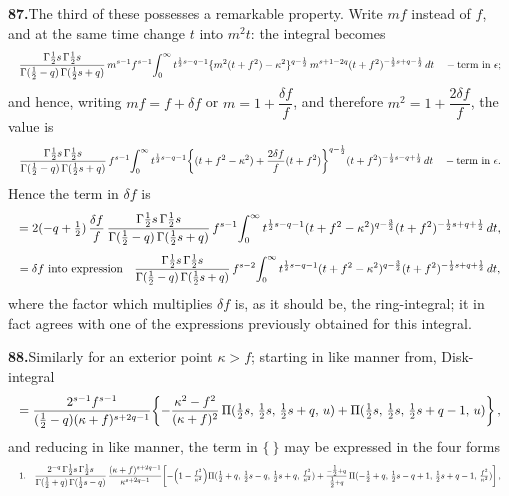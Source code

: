 \documentclass[11pt]{article}
\begin{document}
\noindent\textbf{87.}\quad The third of these possesses a remarkable property. Write $mf$ instead of $f$, and at the same time change $t$ into $m^{2}t$: the integral becomes
\[
\resizebox{\textwidth}{!}{$\displaystyle
\frac{\Gamma\tfrac{1}{2}s\,\Gamma\tfrac{1}{2}s}{\Gamma(\tfrac{1}{2}-q)\,\Gamma(\tfrac{1}{2}s+q)}\,m^{s-1}f^{s-1}\!\int_{0}^{\infty} t^{\frac{1}{2}s-q-1}\{m^{2}(t+f^{2})-\kappa^{2}\}^{q-\frac{1}{2}}\,m^{s+1-2q}(t+f^{2})^{-\frac{1}{2}s+q-\frac{1}{2}}\,dt \quad-\text{term in } \epsilon;$}
\]
and hence, writing $mf=f+\delta f$ or $m=1+\dfrac{\delta f}{f}$, and therefore $m^{2}=1+\dfrac{2\delta f}{f}$, the value is
\[
\resizebox{\textwidth}{!}{$\displaystyle
\frac{\Gamma\tfrac{1}{2}s\,\Gamma\tfrac{1}{2}s}{\Gamma(\tfrac{1}{2}-q)\,\Gamma(\tfrac{1}{2}s+q)}\,f^{s-1}\!\int_{0}^{\infty} t^{\frac{1}{2}s-q-1}\!\left\{(t+f^{2}-\kappa^{2}) + \frac{2\delta f}{f}(t+f^{2})\right\}^{q-\frac{1}{2}}\!(t+f^{2})^{-\frac{1}{2}s-q+\frac{1}{2}}\,dt \quad-\text{term in } \epsilon.$}
\]
Hence the term in $\delta f$ is
\[
\resizebox{\textwidth}{!}{$\displaystyle
= 2(-q+\tfrac{1}{2})\,\frac{\delta f}{f}\,\frac{\Gamma\tfrac{1}{2}s\,\Gamma\tfrac{1}{2}s}{\Gamma(\tfrac{1}{2}-q)\,\Gamma(\tfrac{1}{2}s+q)}\,f^{s-1}\!\int_{0}^{\infty} t^{\frac{1}{2}s-q-1}(t+f^{2}-\kappa^{2})^{q-\frac{3}{2}}(t+f^{2})^{-\frac{1}{2}s+q+\frac{1}{2}}\,dt,$}
\]
\[
\resizebox{\textwidth}{!}{$\displaystyle
= \delta f \text{ into expression}\quad \frac{\Gamma\tfrac{1}{2}s\,\Gamma\tfrac{1}{2}s}{\Gamma(\tfrac{1}{2}-q)\,\Gamma(\tfrac{1}{2}s+q)}\,f^{s-2}\!\int_{0}^{\infty} t^{\frac{1}{2}s-q-1}(t+f^{2}-\kappa^{2})^{q-\frac{3}{2}}(t+f^{2})^{-\frac{1}{2}s+q+\frac{1}{2}}\,dt,$}
\]
where the factor which multiplies $\delta f$ is, as it should be, the ring-integral; it in fact agrees with one of the expressions previously obtained for this integral.

\bigskip

\noindent\textbf{88.}\quad Similarly for an exterior point $\kappa>f$; starting in like manner from, Disk-integral
\[
\resizebox{\textwidth}{!}{$\displaystyle
= \frac{2^{s-1}f^{s-1}}{(\tfrac{1}{2}-q)(\kappa+f)^{s+2q-1}}\!\left\{-\frac{\kappa^{2}-f^{2}}{(\kappa+f)^{2}}\,\Pi(\tfrac{1}{2}s,\,\tfrac{1}{2}s,\,\tfrac{1}{2}s+q,\,u) + \Pi(\tfrac{1}{2}s,\,\tfrac{1}{2}s,\,\tfrac{1}{2}s+q-1,\,u)\right\},$}
\]
and reducing in like manner, the term in $\{\ \}$ may be expressed in the four forms
\[
\resizebox{\textwidth}{!}{$\displaystyle
1.\quad \frac{2^{-q}\,\Gamma\tfrac{1}{2}s\,\Gamma\tfrac{1}{2}s}{\Gamma(\tfrac{1}{2}+q)\,\Gamma(\tfrac{1}{2}s-q)}\,\frac{(\kappa+f)^{s+2q-1}}{\kappa^{s+2q-1}}\!\left[-\!\left(1-\tfrac{f^{2}}{\kappa^{2}}\right)\!\Pi(\tfrac{1}{2}+q,\,\tfrac{1}{2}s-q,\,\tfrac{1}{2}s+q,\,\tfrac{f^{2}}{\kappa^{2}}) + \tfrac{-\tfrac{1}{2}+q}{\tfrac{1}{2}+q}\,\Pi(-\tfrac{1}{2}+q,\,\tfrac{1}{2}s-q+1,\,\tfrac{1}{2}s+q-1,\,\tfrac{f^{2}}{\kappa^{2}})\right],$}
\]
\end{document}
